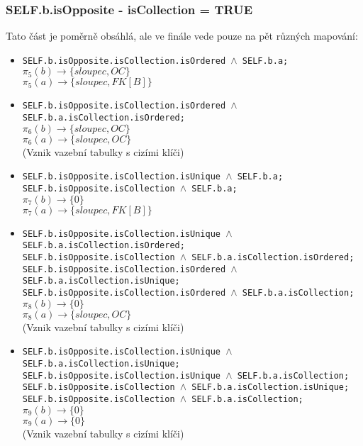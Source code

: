 \documentclass[11pt,a4paper]{article}
\begin{document}
   		\subsubsection{SELF.b.isOpposite - isCollection = TRUE}
   		Tato část je poměrně obsáhlá, ale ve finále vede pouze na pět různých mapování:
   				\begin{itemize}				    
         			\item \texttt	{SELF.b.isOpposite.isCollection.isOrdered $\wedge$ SELF.b.a; \\}        							
         							$\pi_5(b) \to \{ sloupec, OC\}$ \\
         							$\pi_5(a) \to \{ sloupec, FK[B]\}$		
         			\item \texttt	{SELF.b.isOpposite.isCollection.isOrdered $\wedge$ SELF.b.a.isCollection.isOrdered; \\}      							
         							$\pi_6(b) \to \{ sloupec, OC\}$ \\
         							$\pi_6(a) \to \{ sloupec, OC\}$	\\	
         							(Vznik vazební tabulky s cizími klíči)
         			\item \texttt	{SELF.b.isOpposite.isCollection.isUnique $\wedge$ SELF.b.a; \\
         							 SELF.b.isOpposite.isCollection $\wedge$ SELF.b.a; \\}    							
         							$\pi_7(b) \to \{ 0\}$ \\
         							$\pi_7(a) \to \{ sloupec, FK[B]\}$	\\
         			\item \texttt	{SELF.b.isOpposite.isCollection.isUnique $\wedge$ SELF.b.a.isCollection.isOrdered; \\
         							 SELF.b.isOpposite.isCollection $\wedge$ SELF.b.a.isCollection.isOrdered; \\
         							 SELF.b.isOpposite.isCollection.isOrdered $\wedge$ SELF.b.a.isCollection.isUnique; \\
         							 SELF.b.isOpposite.isCollection.isOrdered $\wedge$ SELF.b.a.isCollection; \\}       							
         							$\pi_8(b) \to \{ 0\}$ \\
         							$\pi_8(a) \to \{ sloupec, OC\}$	\\	
         							(Vznik vazební tabulky s cizími klíči)	 
         		     \item \texttt	{SELF.b.isOpposite.isCollection.isUnique $\wedge$ SELF.b.a.isCollection.isUnique; \\
         							 SELF.b.isOpposite.isCollection.isUnique $\wedge$ SELF.b.a.isCollection; \\
         							 SELF.b.isOpposite.isCollection $\wedge$ SELF.b.a.isCollection.isUnique; \\
         							 SELF.b.isOpposite.isCollection $\wedge$ SELF.b.a.isCollection; \\}       							
         							$\pi_9(b) \to \{ 0\}$ \\
         							$\pi_9(a) \to \{ 0\}$	\\	
         							(Vznik vazební tabulky s cizími klíči)	 				   							
   				\end{itemize}			   		    
\end{document}

